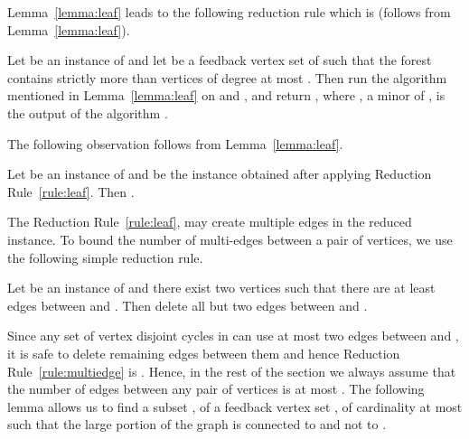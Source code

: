 Lemma~\ref{lemma:leaf} leads to the following reduction rule which is \onesafe{} (follows from Lemma~\ref{lemma:leaf}). 

\begin{redrule}
\label{rule:leaf}
 Let  be an instance of \CP{} and let  be a feedback vertex set of  
such that the forest  contains strictly  
 more than  vertices of degree at most .  
Then run the algorithm  mentioned in Lemma~\ref{lemma:leaf} 
on  and , and return , where , a minor of , is the output of the algorithm .   
\end{redrule}


The following observation follows from Lemma~\ref{lemma:leaf}. 
\begin{observation}
\label{obs:leaf_opt}
Let  be an instance of \CP{} and  be the instance obtained after applying  
Reduction Rule~\ref{rule:leaf}. Then . 
\end{observation}

The Reduction Rule~\ref{rule:leaf}, may create multiple edges in the reduced instance.  
To bound the number of multi-edges between a pair of vertices, we use the following 
simple reduction rule. 
\begin{redrule}
 \label{rule:multiedge}
 Let  be an instance of \CP{} and there exist two vertices  such that 
 there are at least  edges between  and . Then delete all but two edges between  and 
 .  
\end{redrule} 

Since any set of vertex disjoint cycles in  can use at most two edges between  and , 
it is safe to delete remaining edges between them and hence Reduction Rule~\ref{rule:multiedge} 
is \onesafe.  Hence, in the rest of the section we always assume that 
the number of edges between any pair of vertices is at most . 
The following lemma allows us to find a subset , of a feedback vertex set , of cardinality at most  such that the large portion of the graph  is connected to  and not to .  


